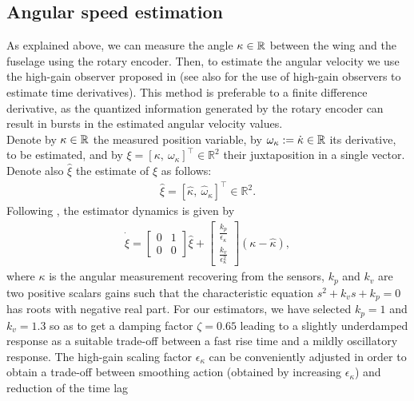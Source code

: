 \subsection{Angular speed estimation}
As explained above, we can measure the angle $\kappa \in {\mathbb R}$ between the wing and the fuselage using the rotary encoder. Then, to estimate the angular velocity we use the high-gain observer proposed in \cite{203613} (see also \cite{1032320} for the use of high-gain observers to estimate time derivatives). This method is preferable to a finite difference derivative, as the quantized information generated by the rotary encoder can result in bursts in the estimated angular velocity values.\\ 
Denote by $\kappa \in {\mathbb R}$ the measured position variable, by $\omega_{\kappa} := \dot \kappa  \in {\mathbb R}$ its derivative, to be estimated, and by $\xi = [\kappa,~\omega_{\kappa}]^\top \in \mathbb{R}^2$ their juxtaposition in a single vector. Denote also $\hat{\xi}$ the estimate of $\xi$ as follows:
\begin{align*}
    \hat{\xi} = [\hat{\kappa},~\hat{\omega}_{\kappa}]^\top \in \mathbb{R}^2.
\end{align*}
Following \cite{203613}, the estimator dynamics is given by
\begin{align}
\label{eq:high_dyn}
    \dot{\hat{\xi}} =  \begin{bmatrix}0 & 1 \\ 0 & 0 \end{bmatrix} \hat{\xi}+ \begin{bmatrix}\frac{k_{p}}{\epsilon_{\kappa}}  \\ \frac{k_{v}}{\epsilon_{\kappa}^{2}}  \end{bmatrix} (\kappa - \hat{\kappa}),
\end{align}
where $\kappa$ is the angular measurement recovering from the sensors, $k_{p}$ and $k_{v}$ are two positive scalars gains such that the characteristic equation $s^{2} + k_{v} s + k_{p} = 0$ has roots with negative real part. For our estimators, we have selected $k_{p} = 1$ and $k_{v} = 1.3$ so as to get a damping factor $\zeta = 0.65$ leading to a slightly underdamped response as a suitable trade-off between a fast rise time and a mildly oscillatory response. The high-gain scaling factor
$\epsilon_{\kappa}$ can be conveniently adjusted in order to obtain a trade-off between smoothing action (obtained by increasing $\epsilon_{\kappa}$) and reduction of the time lag
